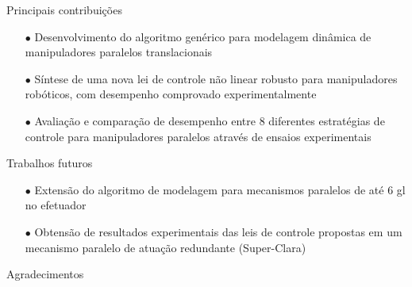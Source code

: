 \documentclass[25pt,landscape]{beamer}
\begin{document}
\begin{frame}{Principais contribuições}
    \begin{block}{}
    	\pause
        \begin{itemize}
            \item[$\bullet$] Desenvolvimento do algoritmo genérico para modelagem dinâmica de manipuladores paralelos translacionais \\[8pt]
            \pause
            \item[$\bullet$] Síntese de uma nova lei de controle não linear robusto para manipuladores robóticos, com desempenho comprovado experimentalmente \\[8pt]
            \pause
            \item[$\bullet$] Avaliação e comparação de desempenho entre 8 diferentes estratégias de controle para manipuladores paralelos através de ensaios experimentais \\[8pt]
        \end{itemize}
    \end{block}
\end{frame}

\begin{frame}{Trabalhos futuros}
    \begin{block}{}
        \begin{itemize}
            \item[$\bullet$] Extensão do algoritmo de modelagem para mecanismos paralelos de até 6 gl no efetuador \\[8pt]
            \pause
            \item[$\bullet$] Obtensão de resultados experimentais das leis de controle propostas em um mecanismo paralelo de atuação redundante (Super-Clara) \\[8pt]
        \end{itemize}
    \end{block}
\end{frame}

\begin{frame}{Agradecimentos}

\end{frame}












\end{document}
